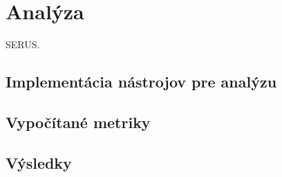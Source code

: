 \chapter{Analýza}

SERUS.

\section{Implementácia nástrojov pre analýzu}
\section{Vypočítané metriky}
\section{Výsledky}
